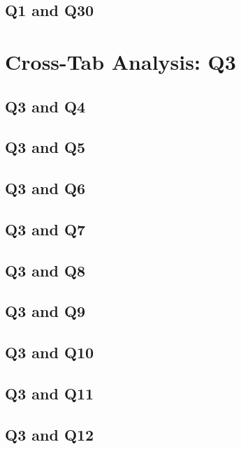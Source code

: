 \documentclass{report}
\begin{document}
\clearpage
\section{Q1 and Q30}


\chapter{Cross-Tab Analysis: Q3}
\section{Q3 and Q4}


\clearpage
\section{Q3 and Q5}


\clearpage
\section{Q3 and Q6}


\clearpage
\section{Q3 and Q7}


\clearpage
\section{Q3 and Q8}


\clearpage
\section{Q3 and Q9}


\clearpage
\section{Q3 and Q10}


\clearpage
\section{Q3 and Q11}


\clearpage
\section{Q3 and Q12}

\end{document}
